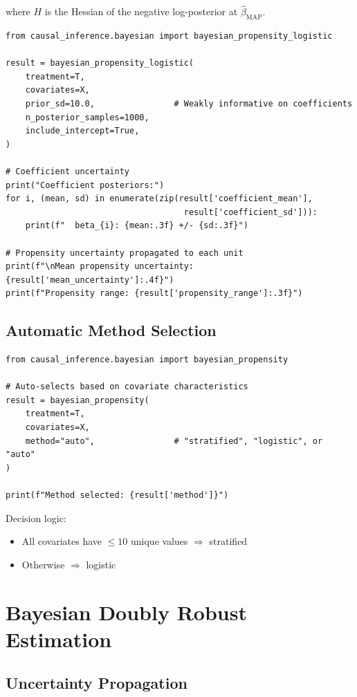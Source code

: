 where $H$ is the Hessian of the negative log-posterior at $\hat{\beta}_{\text{MAP}}$.

\begin{verbatim}
from causal_inference.bayesian import bayesian_propensity_logistic

result = bayesian_propensity_logistic(
    treatment=T,
    covariates=X,
    prior_sd=10.0,                # Weakly informative on coefficients
    n_posterior_samples=1000,
    include_intercept=True,
)

# Coefficient uncertainty
print("Coefficient posteriors:")
for i, (mean, sd) in enumerate(zip(result['coefficient_mean'],
                                    result['coefficient_sd'])):
    print(f"  beta_{i}: {mean:.3f} +/- {sd:.3f}")

# Propensity uncertainty propagated to each unit
print(f"\nMean propensity uncertainty: {result['mean_uncertainty']:.4f}")
print(f"Propensity range: {result['propensity_range']:.3f}")
\end{verbatim}

\subsection{Automatic Method Selection}

\begin{verbatim}
from causal_inference.bayesian import bayesian_propensity

# Auto-selects based on covariate characteristics
result = bayesian_propensity(
    treatment=T,
    covariates=X,
    method="auto",                # "stratified", "logistic", or "auto"
)

print(f"Method selected: {result['method']}")
\end{verbatim}

Decision logic:
\begin{itemize}
\item All covariates have $\leq 10$ unique values $\Rightarrow$ stratified
\item Otherwise $\Rightarrow$ logistic
\end{itemize}


\section{Bayesian Doubly Robust Estimation}

\subsection{Uncertainty Propagation}


